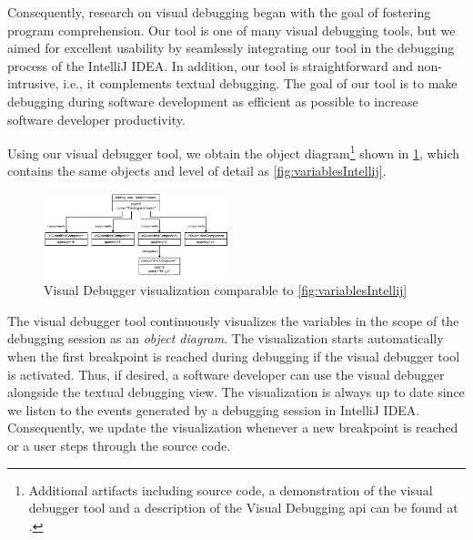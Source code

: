 \documentclass[conference]{IEEEtran}
\newcommand{\intellij}{IntelliJ IDEA}
\begin{document}
Consequently, research on visual debugging began with the goal of fostering program comprehension.
Our tool is one of many visual debugging tools, but we aimed for excellent usability by seamlessly integrating our tool in the debugging process of the \intellij{}.
In addition, our tool is straightforward and non-intrusive, i.e., it complements textual debugging.
The goal of our tool is to make debugging during software development as efficient as possible to increase software developer productivity.

Using our visual debugger tool, we obtain the object diagram\footnote{\label{footnote:artifacts} Additional artifacts including source code, a demonstration of the visual debugger tool and a description of the Visual Debugging \acrshort*{api} can be found at \cite{ArtifactsICSME2022}.} shown in \cref{fig:visualDebuggerVariables}, which contains the same objects and level of detail as \cref{fig:variablesIntellij}.

\begin{figure}[h]
    \centering
    \includegraphics[width=0.48\textwidth]{images/VD-partsList-objects.pdf}
    \caption{Visual Debugger visualization comparable to \cref{fig:variablesIntellij}}
    \label{fig:visualDebuggerVariables}
\end{figure}

The visual debugger tool continuously visualizes the variables in the scope of the debugging session as an \textit{object diagram}.
The visualization starts automatically when the first breakpoint is reached during debugging if the visual debugger tool is activated.
Thus, if desired, a software developer can use the visual debugger alongside the textual debugging view.
The visualization is always up to date since we listen to the events generated by a debugging session in \intellij{}.
Consequently, we update the visualization whenever a new breakpoint is reached or a user steps through the source code.
\end{document}
